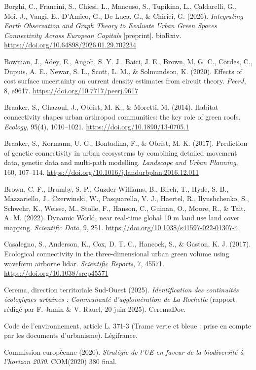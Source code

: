 \documentclass[a4paper,11pt]{report}
\begin{document}
Borghi, C., Francini, S., Chiesi, L., Mancuso, S., Tupikina, L., Caldarelli, G., Moi, J., Vangi, E., D'Amico, G., De Luca, G., \& Chirici, G. (2026). \textit{Integrating Earth Observation and Graph Theory to Evaluate Urban Green Spaces Connectivity Across European Capitals} [preprint]. bioRxiv. \url{https://doi.org/10.64898/2026.01.29.702234}

Bowman, J., Adey, E., Angoh, S. Y. J., Baici, J. E., Brown, M. G. C., Cordes, C., Dupuis, A. E., Newar, S. L., Scott, L. M., \& Solmundson, K. (2020). Effects of cost surface uncertainty on current density estimates from circuit theory. \textit{PeerJ}, 8, e9617. \url{https://doi.org/10.7717/peerj.9617}

Braaker, S., Ghazoul, J., Obrist, M. K., \& Moretti, M. (2014). Habitat connectivity shapes urban arthropod communities: the key role of green roofs. \textit{Ecology}, 95(4), 1010--1021. \url{https://doi.org/10.1890/13-0705.1}

Braaker, S., Kormann, U. G., Bontadina, F., \& Obrist, M. K. (2017). Prediction of genetic connectivity in urban ecosystems by combining detailed movement data, genetic data and multi-path modelling. \textit{Landscape and Urban Planning}, 160, 107--114. \url{https://doi.org/10.1016/j.landurbplan.2016.12.011}

Brown, C. F., Brumby, S. P., Guzder-Williams, B., Birch, T., Hyde, S. B., Mazzariello, J., Czerwinski, W., Pasquarella, V. J., Haertel, R., Ilyushchenko, S., Schwehr, K., Weisse, M., Stolle, F., Hanson, C., Guinan, O., Moore, R., \& Tait, A. M. (2022). Dynamic World, near real-time global 10 m land use land cover mapping. \textit{Scientific Data}, 9, 251. \url{https://doi.org/10.1038/s41597-022-01307-4}

Casalegno, S., Anderson, K., Cox, D. T. C., Hancock, S., \& Gaston, K. J. (2017). Ecological connectivity in the three-dimensional urban green volume using waveform airborne lidar. \textit{Scientific Reports}, 7, 45571. \url{https://doi.org/10.1038/srep45571}

Cerema, direction territoriale Sud-Ouest (2025). \textit{Identification des continuités écologiques urbaines : Communauté d'agglomération de La Rochelle} (rapport rédigé par F. Jamin \& V. Rauel, 20 juin 2025). CeremaDoc.

Code de l'environnement, article L. 371-3 (Trame verte et bleue : prise en compte par les documents d'urbanisme). Légifrance.

Commission européenne (2020). \textit{Stratégie de l'UE en faveur de la biodiversité à l'horizon 2030}. COM(2020) 380 final.
\end{document}
